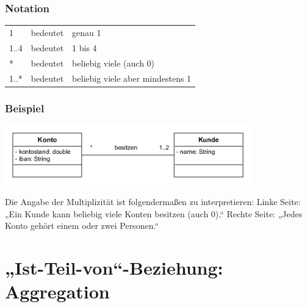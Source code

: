 \subsubsection{Notation}

\begin{tabular}{lll}
1       & bedeutet & genau 1\\
1..4    & bedeutet & 1 bis 4\\
{}*     & bedeutet & beliebig viele (auch 0)\\
1..*    & bedeutet & beliebig viele aber mindestens 1\\
\end{tabular}

\subsubsection{Beispiel}

\includegraphics[width=0.8\textwidth]{./inf/SEKII/15_UML_Klassendiagramme/Multiplizitaet.png}

Die Angabe der Multiplizität ist folgendermaßen zu interpretieren:
Linke Seite: „Ein Kunde kann beliebig viele Konten besitzen (auch 0).“
Rechte Seite: „Jedes Konto gehört einem oder zwei Personen.“


\section{„Ist-Teil-von“-Beziehung: Aggregation}

